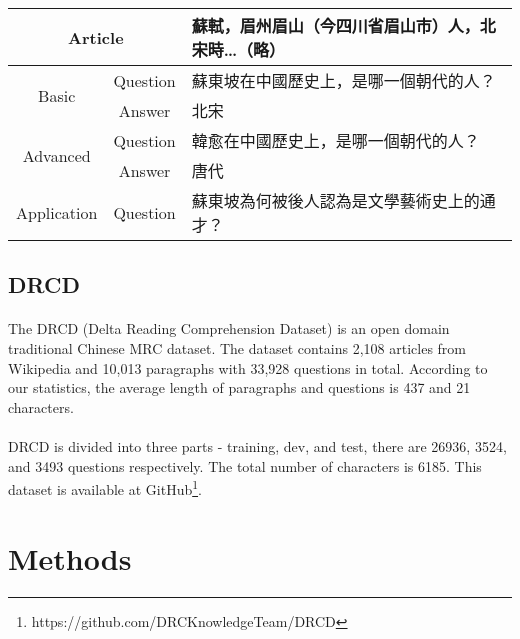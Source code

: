 \documentclass{article}
\begin{document}
\begin{CJK*}{UTF8}{bsmi}
  \begin{table}[!ht]
    \centering
    \begin{tabular}{|c|c|l|}
      \hline
      \multicolumn{2}{|c|}{Article} & 蘇軾，眉州眉山（今四川省眉山市）人，北宋時…（略） \\ \hline
      \multirow{2}{*}{Basic} & Question & 蘇東坡在中國歷史上，是哪一個朝代的人？ \\ \cline{2-3} 
      & Answer & 北宋 \\ \hline
      \multirow{2}{*}{Advanced} & Question & 韓愈在中國歷史上，是哪一個朝代的人？ \\ \cline{2-3} 
      & Answer & 唐代 \\ \hline
      Application & Question & 蘇東坡為何被後人認為是文學藝術史上的通才？ \\ \hline
    \end{tabular}
  \end{table}
\end{CJK*}

\subsection{DRCD}
\paragraph{}
The DRCD\cite{shao2018drcd} (Delta Reading Comprehension Dataset) is an open domain traditional Chinese MRC dataset. The dataset contains 2,108 articles from Wikipedia and 10,013 paragraphs with 33,928 questions in total. According to our statistics, the average length of paragraphs and questions is 437 and 21 characters.

\paragraph{}
DRCD is divided into three parts - training, dev, and test, there are 26936, 3524, and 3493 questions respectively. The total number of characters is 6185. This dataset is available at GitHub\footnote{\label{drcd_github}https://github.com/DRCKnowledgeTeam/DRCD}.

\section{Methods}
\end{document}
